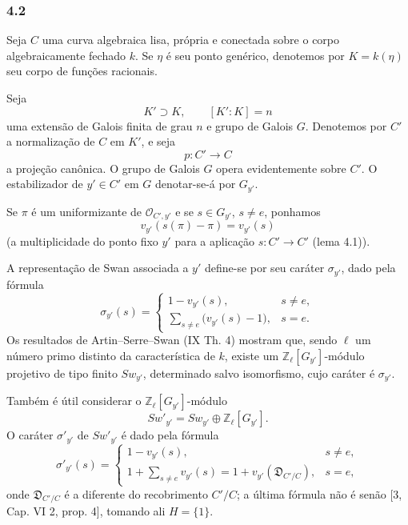 \subsubsection*{4.2}

Seja $C$ uma curva algebraica lisa, própria e conectada sobre o corpo algebraicamente fechado $k$. Se $\eta$ é seu ponto genérico, denotemos por $K=k(\eta)$ seu corpo de funções racionais.

Seja
\[
K'\supset K,\qquad [K':K]=n
\]
uma extensão de Galois finita de grau $n$ e grupo de Galois $G$. Denotemos por $C'$ a normalização de $C$ em $K'$, e seja
\[
p:C'\longrightarrow C
\]
a projeção canônica. O grupo de Galois $G$ opera evidentemente sobre $C'$. O estabilizador de $y'\in C'$ em $G$ denotar-se-á por $G_{y'}$.

Se $\pi$ é um uniformizante de $\mathcal O_{C',y'}$ e se $s\in G_{y'}$, $s\ne e$, ponhamos
\[
v_{y'}(s(\pi)-\pi)=v_{y'}(s)
\tag{4.2.1}
\]
(a multiplicidade do ponto fixo $y'$ para a aplicação $s:C'\to C'$ (lema 4.1)).%

A representação de Swan associada a $y'$ define-se por seu caráter $\sigma_{y'}$, dado pela fórmula
\[
\sigma_{y'}(s)=
\begin{cases}
1-v_{y'}(s),& s\ne e,\\[0.4em]
\displaystyle\sum_{s\ne e}\bigl(v_{y'}(s)-1\bigr),& s=e.
\end{cases}
\tag{4.2.2}
\]
Os resultados de Artin--Serre--Swan (IX Th. 4) mostram que, sendo $\ell$ um número primo distinto da característica de $k$, existe um $\mathbb Z_\ell[G_{y'}]$-módulo projetivo de tipo finito $Sw_{y'}$, determinado salvo isomorfismo, cujo caráter é $\sigma_{y'}$.

Também é útil considerar o $\mathbb Z_\ell[G_{y'}]$-módulo
\[
Sw'_{y'}=Sw_{y'}\oplus\mathbb Z_\ell[G_{y'}].
\tag{4.2.3}
\]
O caráter $\sigma'_{y'}$ de $Sw'_{y'}$ é dado pela fórmula
\[
\sigma'_{y'}(s)=
\begin{cases}
1-v_{y'}(s),& s\ne e,\\[0.4em]
\displaystyle 1+\sum_{s\ne e}v_{y'}(s)
=1+v_{y'}(\mathfrak D_{C'/C}),& s=e,
\end{cases}
\tag{4.2.4}
\]
onde $\mathfrak D_{C'/C}$ é a diferente do recobrimento $C'/C$; a última fórmula não é senão [3, Cap. VI 2, prop. 4], tomando ali $H=\{1\}$.

